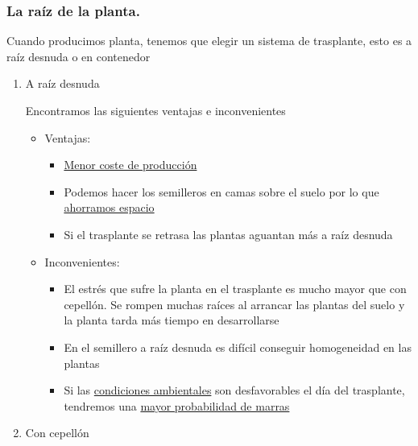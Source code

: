 \documentclass[a4paper,12pt,oneside]{article}
\begin{document}
\subsubsection{La raíz de la planta.}
\label{sec:org7a38bbd}
Cuando producimos planta, tenemos que elegir un sistema de trasplante, esto es
a raíz desnuda o en contenedor

\begin{enumerate}
\item A raíz desnuda
\label{sec:org97a0a31}

Encontramos las siguientes ventajas e inconvenientes
\begin{itemize}
\item Ventajas:\\
\begin{itemize}
\item \uline{Menor coste de producción}
\item Podemos hacer los semilleros en camas sobre el suelo por lo que \uline{ahorramos
espacio}
\item Si el trasplante se retrasa las plantas aguantan más a raíz desnuda
\end{itemize}
\item Inconvenientes:\\
\begin{itemize}
\item El estrés que sufre la planta en el trasplante es mucho mayor que con
cepellón. Se rompen muchas raíces al arrancar las plantas del suelo y la
planta tarda más tiempo en desarrollarse
\item En el semillero a raíz desnuda es difícil conseguir homogeneidad en las plantas
\item Si las \uline{condiciones ambientales} son desfavorables el día del trasplante,
tendremos una \uline{mayor probabilidad de marras}
\end{itemize}
\end{itemize}

\item Con cepellón
\label{sec:orgcacab61}


\end{enumerate}
\end{document}
